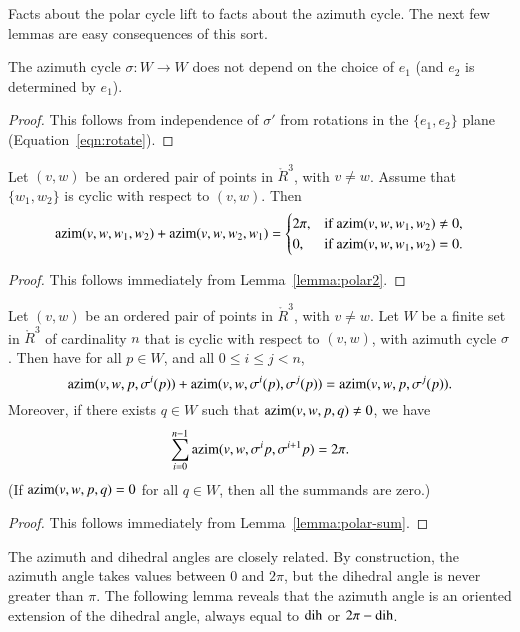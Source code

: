 Facts about the polar cycle lift to facts about the azimuth cycle.
The next few lemmas are easy consequences of this sort.


\begin{lemma} The azimuth cycle $\sigma:W\to W$ does not depend
on the choice of $e_1$ (and $e_2$ is determined by $e_1$).
\end{lemma}

\begin{proof} This follows from independence of $\sigma'$ from
rotations in the $\{e_1,e_2\}$ plane  (Equation~\ref{eqn:rotate}).
\end{proof}


\begin{lemma} Let $(v,w)$ be an ordered pair of points in $\ring{R}^3$,
with $v\ne w$.  Assume that $\{w_1,w_2\}$ is cyclic
with respect to $(v,w)$.  Then
  $$
  {\operatorname{azim}}(v,w,w_1,w_2) + {\operatorname{azim}}(v,w,w_2,w_1) 
  = \begin{cases} 2\pi, & \text{if }{\operatorname{azim}}(v,w,w_1,w_2)\ne 0,\\
    0, & \text{if }{\operatorname{azim}}(v,w,w_1,w_2)=0.
    \end{cases}
    $$
\end{lemma}

\begin{proof} This follows immediately from Lemma~\ref{lemma:polar2}.
\end{proof}

\begin{lemma} 
Let $(v,w)$ be an ordered pair of points in $\ring{R}^3$,
with $v\ne w$.  Let $W$ be a finite set in $\ring{R}^3$ of
cardinality $n$ that
is cyclic with respect to $(v,w)$,
with azimuth cycle $\sigma$.
Then have for all $p\in W$,
and all $0\le i \le j < n$,
   $$
   {\operatorname{azim}}(v,w,p,\sigma^i(p)) +
    {\operatorname{azim}}(v,w,\sigma^i(p),\sigma^j(p)) =
   {\operatorname{azim}}(v,w,p,\sigma^j(p)).
   $$
Moreover, if there exists $q\in W$ such that 
${\operatorname{azim}}(v,w,p,q)\ne0$,
we have 
  $$
  \sum_{i=0}^{n-1} {\operatorname{azim}}(v,w,\sigma^ip,\sigma^{i+1}p) = 2\pi.
  $$
(If ${\operatorname{azim}}(v,w,p,q)=0$ for all $q\in W$, then all the
summands are zero.)
\end{lemma}

\begin{proof} This follows immediately from 
Lemma~\ref{lemma:polar-sum}.
\end{proof}


The azimuth and dihedral angles are closely related.   By construction,
the azimuth angle takes values between $0$ and $2\pi$, but the dihedral
angle is never greater than $\pi$.  The following lemma reveals that
the azimuth angle is an oriented extension of the dihedral angle, always
equal to $\operatorname{dih}$ or $2\pi - \operatorname{dih}$.


